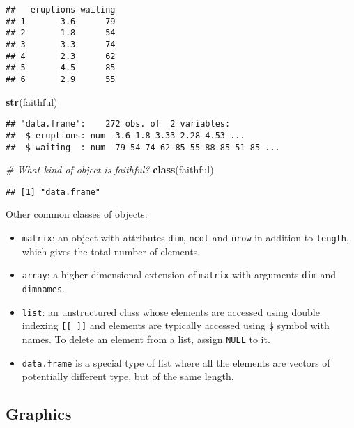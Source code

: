 \documentclass[
]{book}
\newenvironment{Shaded}{\begin{snugshade}}{\end{snugshade}}
\newcommand{\CommentTok}[1]{\textcolor[rgb]{0.56,0.35,0.01}{\textit{#1}}}
\newcommand{\KeywordTok}[1]{\textcolor[rgb]{0.13,0.29,0.53}{\textbf{#1}}}
\newcommand{\NormalTok}[1]{#1}
\providecommand{\tightlist}{%
  \setlength{\itemsep}{0pt}\setlength{\parskip}{0pt}}
\begin{document}
\begin{verbatim}
##   eruptions waiting
## 1       3.6      79
## 2       1.8      54
## 3       3.3      74
## 4       2.3      62
## 5       4.5      85
## 6       2.9      55
\end{verbatim}

\begin{Shaded}
\begin{Highlighting}[]
\KeywordTok{str}\NormalTok{(faithful)}
\end{Highlighting}
\end{Shaded}

\begin{verbatim}
## 'data.frame':    272 obs. of  2 variables:
##  $ eruptions: num  3.6 1.8 3.33 2.28 4.53 ...
##  $ waiting  : num  79 54 74 62 85 55 88 85 51 85 ...
\end{verbatim}

\begin{Shaded}
\begin{Highlighting}[]
\CommentTok{# What kind of object is faithful? }
\KeywordTok{class}\NormalTok{(faithful)}
\end{Highlighting}
\end{Shaded}

\begin{verbatim}
## [1] "data.frame"
\end{verbatim}

Other common classes of objects:

\begin{itemize}
\tightlist
\item
  \texttt{matrix}: an object with attributes \texttt{dim}, \texttt{ncol} and \texttt{nrow} in addition to \texttt{length}, which gives the total number of elements.
\item
  \texttt{array}: a higher dimensional extension of \texttt{matrix} with arguments \texttt{dim} and \texttt{dimnames}.
\item
  \texttt{list}: an unstructured class whose elements are accessed using double indexing \texttt{{[}{[}\ {]}{]}} and elements are typically accessed using \texttt{\$} symbol with names. To delete an element from a list, assign \texttt{NULL} to it.
\item
  \texttt{data.frame} is a special type of list where all the elements are vectors of potentially different type, but of the same length.
\end{itemize}

\hypertarget{graphics}{%
\subsection{Graphics}\label{graphics}}
\end{document}
